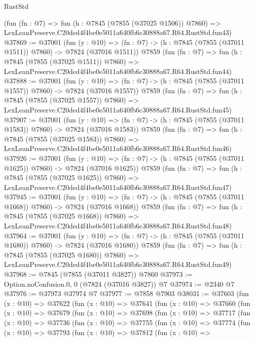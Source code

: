 \begin{lexlean}{RustStd}
\begin{coremodule}
    (fun (fn : @7) =>
    fun (h : @7845 (@7855 (@37025 @1506)) @7860) =>
    LexLeanPreserve.C20ded4f4be0e5011a640fb6c30888a67.R64.RustStd.fun43)
@37869 := @37001
    (fun (y : @10) => (fn : @7) -> (h : @7845 (@7855 (@37011 @1511)) @7860) -> @7824 (@37016 @1511))
    @7859
    (fun (fn : @7) =>
    fun (h : @7845 (@7855 (@37025 @1511)) @7860) =>
    LexLeanPreserve.C20ded4f4be0e5011a640fb6c30888a67.R64.RustStd.fun44)
@37888 := @37001
    (fun (y : @10) => (fn : @7) -> (h : @7845 (@7855 (@37011 @1557)) @7860) -> @7824 (@37016 @1557))
    @7859
    (fun (fn : @7) =>
    fun (h : @7845 (@7855 (@37025 @1557)) @7860) =>
    LexLeanPreserve.C20ded4f4be0e5011a640fb6c30888a67.R64.RustStd.fun45)
@37907 := @37001
    (fun (y : @10) => (fn : @7) -> (h : @7845 (@7855 (@37011 @1583)) @7860) -> @7824 (@37016 @1583))
    @7859
    (fun (fn : @7) =>
    fun (h : @7845 (@7855 (@37025 @1583)) @7860) =>
    LexLeanPreserve.C20ded4f4be0e5011a640fb6c30888a67.R64.RustStd.fun46)
@37926 := @37001
    (fun (y : @10) => (fn : @7) -> (h : @7845 (@7855 (@37011 @1625)) @7860) -> @7824 (@37016 @1625))
    @7859
    (fun (fn : @7) =>
    fun (h : @7845 (@7855 (@37025 @1625)) @7860) =>
    LexLeanPreserve.C20ded4f4be0e5011a640fb6c30888a67.R64.RustStd.fun47)
@37945 := @37001
    (fun (y : @10) => (fn : @7) -> (h : @7845 (@7855 (@37011 @1668)) @7860) -> @7824 (@37016 @1668))
    @7859
    (fun (fn : @7) =>
    fun (h : @7845 (@7855 (@37025 @1668)) @7860) =>
    LexLeanPreserve.C20ded4f4be0e5011a640fb6c30888a67.R64.RustStd.fun48)
@37964 := @37001
    (fun (y : @10) => (fn : @7) -> (h : @7845 (@7855 (@37011 @1680)) @7860) -> @7824 (@37016 @1680))
    @7859
    (fun (fn : @7) =>
    fun (h : @7845 (@7855 (@37025 @1680)) @7860) =>
    LexLeanPreserve.C20ded4f4be0e5011a640fb6c30888a67.R64.RustStd.fun49)
@37968 := @7845 (@7855 (@37011 @3827)) @7860
@37973 := Option.noConfusion.{0, 0} (@7824 (@37016 @3827)) @7
@37974 := @2340 @7
@37976 := @37973 @37974 @7
@37977 := @7858 @7903
@38031 := @37603
    (fun (x : @10) =>
    @37622
      (fun (x : @10) =>
      @37641
        (fun (x : @10) =>
        @37660
          (fun (x : @10) =>
          @37679
            (fun (x : @10) =>
            @37698
              (fun (x : @10) =>
              @37717
                (fun (x : @10) =>
                @37736
                  (fun (x : @10) =>
                  @37755
                    (fun (x : @10) =>
                    @37774
                      (fun (x : @10) =>
                      @37793
                        (fun (x : @10) =>
                        @37812
                          (fun (x : @10) =>

\end{coremodule}
\end{lexlean}
